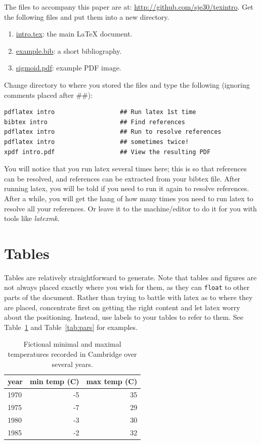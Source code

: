 \documentclass[]{article}
\providecommand*{\latex}{\LaTeX\xspace}
\begin{document}
The files to accompany this paper are at:
\url{http://github.com/sje30/texintro}.  Get the
following files and put them into a new directory.

\begin{enumerate}
\item \url{intro.tex}: the main \latex document.
\item \url{example.bib}: a short bibliography.
\item \url{sigmoid.pdf}: example PDF image.
\end{enumerate}

Change directory to where you stored the files and type the
following (ignoring comments placed after \#\#):

\begin{verbatim}
pdflatex intro                  ## Run latex 1st time
bibtex intro                    ## Find references
pdflatex intro                  ## Run to resolve references
pdflatex intro                  ## sometimes twice!
xpdf intro.pdf                  ## View the resulting PDF
\end{verbatim}

You will notice that you run latex several times here; this is so that
references can be resolved, and references can be extracted from your
bibtex file.  After running latex, you will be told if you need to run
it again to resolve references.  After a while, you will get the hang
of how many times you need to run latex to resolve all your
references.  Or leave it to the machine/editor to do it for you with
tools like \textit{latexmk}.

\section{Tables}

Tables are relatively straightforward to generate.  Note that tables
and figures are not always placed exactly where you wish for them, as
they can \texttt{float} to other parts of the document.  Rather than
trying to battle with latex as to where they are placed, concentrate
first on getting the right content and let latex worry about the
positioning.  Instead, use labels to your tables to refer to them.
See Table~\ref{tab:simple} and Table~\ref{tab:pars} for examples.


\begin{table}
  \centering
  \begin{tabular}{|l|rr|}
    \hline
    year & min temp (C) & max temp (C)\\ \hline
    1970 & -5 & 35\\
    1975 & -7 & 29\\
    1980 & -3 & 30\\
    1985 & -2 & 32\\ \hline
  \end{tabular}
  \caption{Fictional minimal and maximal temperatures recorded in
    Cambridge over several years.}
  \label{tab:simple}
\end{table}
\end{document}
